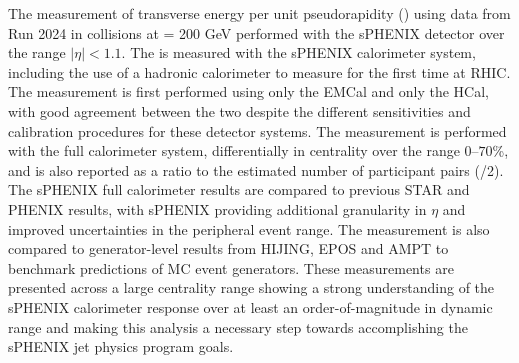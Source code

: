 The measurement of transverse energy per unit pseudorapidity (\detdeta) using data from Run 2024 in \auau collisions at \snn = 200 GeV performed with the sPHENIX detector over the range $\left|\eta\right| < 1.1$. 
The \detdeta is measured with the sPHENIX calorimeter system, including the use of a hadronic calorimeter to measure \detdeta for the first time at RHIC. 
The measurement is first performed using only the EMCal and only the HCal, with good agreement between the two despite the different sensitivities and calibration procedures for these detector systems. 
The measurement is performed with the full calorimeter system, differentially in centrality over the range $0$--$70$\%, and is also reported as a ratio to the estimated number of participant pairs (\Npart/2). 
The sPHENIX full calorimeter results are compared to previous STAR and PHENIX results, with sPHENIX providing additional granularity in $\eta$ and improved uncertainties in the peripheral event range. 
The measurement is also compared to generator-level results from HIJING, EPOS and AMPT to benchmark predictions of MC event generators. 
These measurements are presented across a large centrality range showing a strong understanding of the sPHENIX calorimeter response over at least an order-of-magnitude in dynamic range and making this analysis a necessary step towards accomplishing the sPHENIX jet physics program goals. 